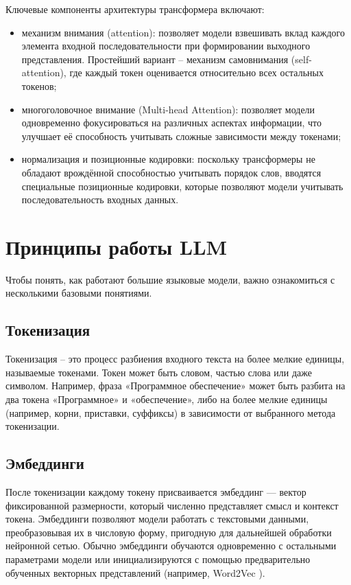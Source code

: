 Ключевые компоненты архитектуры трансформера включают:
\begin{itemize}
    \item 
    механизм внимания (attention): 
    позволяет модели взвешивать вклад каждого элемента входной последовательности при формировании выходного представления. 
    Простейший вариант -- механизм самовнимания (self-attention), где каждый токен оценивается относительно всех остальных токенов;
    \item
    многоголовочное внимание (Multi-head Attention): 
    позволяет модели одновременно фокусироваться на различных аспектах информации, что улучшает её способность учитывать сложные зависимости между токенами;
    \item
    нормализация и позиционные кодировки: 
    поскольку трансформеры не обладают врождённой способностью учитывать порядок слов, вводятся специальные позиционные кодировки, 
    которые позволяют модели учитывать последовательность входных данных.

\end{itemize}
    
\section{Принципы работы LLM}

Чтобы понять, как работают большие языковые модели, важно ознакомиться с несколькими базовыми понятиями.

\subsection{Токенизация} 

Токенизация – это процесс разбиения входного текста на более мелкие единицы, называемые токенами. 
Токен может быть словом, частью слова или даже символом. 
Например, фраза «Программное обеспечение» может быть разбита на два токена «Программное» и «обеспечение», 
либо на более мелкие единицы (например, корни, приставки, суффиксы) в зависимости от выбранного метода токенизации.

\subsection{Эмбеддинги}

После токенизации каждому токену присваивается эмбеддинг — вектор фиксированной размерности, который численно представляет смысл и контекст токена. 
Эмбеддинги позволяют модели работать с текстовыми данными, преобразовывая их в числовую форму, пригодную для дальнейшей обработки нейронной сетью. 
Обычно эмбеддинги обучаются одновременно с остальными параметрами модели или инициализируются с помощью предварительно обученных векторных представлений (например, Word2Vec \cite{lib:word2vec}).

